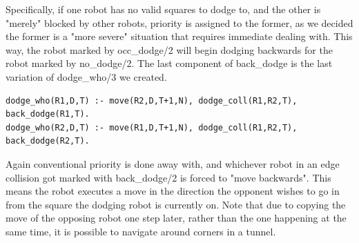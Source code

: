 \documentclass{llncs}
\begin{document}
Specifically, if one robot has no valid squares to dodge to, and the other is "merely" blocked by other robots, priority is assigned to the former, as we decided the former is a "more severe" situation that requires immediate dealing with. This way, the robot marked by occ\_dodge/2 will begin dodging backwards for the robot marked by no\_dodge/2.\newline\newline
The last component of back\_dodge is the last variation of dodge\_who/3 we created.
\begin{lstlisting}[basicstyle=\fontsize{9}{11}\selectfont\ttfamily,frame=single,breaklines=true]
dodge_who(R1,D,T) :- move(R2,D,T+1,N), dodge_coll(R1,R2,T), back_dodge(R1,T).
dodge_who(R2,D,T) :- move(R1,D,T+1,N), dodge_coll(R1,R2,T), back_dodge(R2,T).
\end{lstlisting}\newpage
Again conventional priority is done away with, and whichever robot in an edge collision got marked with back\_dodge/2 is forced to "move backwards". This means the robot executes a move in the direction the opponent wishes to go in from the square the dodging robot is currently on. Note that due to copying the move of the opposing robot one step later, rather than the one happening at the same time, it is possible to navigate around corners in a tunnel.
\end{document}
